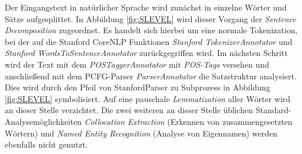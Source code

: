 Der Eingangstext in natürlicher Sprache wird zunächst in einzelne Wörter und Sätze aufgesplittet. In Abbildung \ref{fig:SLEVEL} wird dieser Vorgang der \textit{Sentence Decomposition} zugeordnet. Es handelt sich hierbei um eine normale Tokenization, bei der auf die Stanford CoreNLP Funktionen \textit{Stanford TokenizerAnnotator} und \textit{Stanford WordsToSentenceAnnotator} zurückgegriffen wird. Im nächsten Schritt wird der Text mit dem \textit{POSTaggerAnnotator} mit \textit{POS-Tags} versehen und anschließend mit dem PCFG-Parser \textit{ParserAnnotator} die Satzstruktur analysiert. Dies wird durch den Pfeil von StanfordParser zu Subprozess in Abbildung \ref{fig:SLEVEL} symbolisiert. Auf eine pauschale \textit{Lemmatization} aller Wörter wird an dieser Stelle verzichtet. Die zwei weiteren an dieser Stelle üblichen Standard-Analysemöglichkeiten \textit{Collocation Extraction} (Erkennen von zusammengesetzten Wörtern) und \textit{Named Entity Recognition} (Analyse von Eigennamen) werden ebenfalls nicht genutzt.\par

